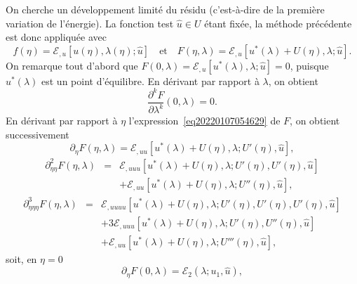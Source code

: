 \documentclass{article}
\newcommand{\nocomma}{}
\newcommand{\nosymbol}{}
\begin{document}
On cherche un d{\'e}veloppement limit{\'e} du r{\'e}sidu (c'est-{\`a}-dire de
la premi{\`e}re variation de l'{\'e}nergie). La fonction test $\hat{u} \in U$
{\'e}tant fix{\'e}e, la m{\'e}thode pr{\'e}c{\'e}dente est donc appliqu{\'e}e
avec
\begin{equation}
  \label{eq20220107054629} f (\eta) =\mathcal{E}_{, u} [u (\eta), \lambda
  (\eta) ; \hat{u}] \quad \text{et} \quad F (\eta, \lambda) =\mathcal{E}_{, u}
  [u^{\ast} (\lambda) + U (\eta), \lambda ; \hat{u}] .
\end{equation}
On remarque tout d'abord que $F (0, \lambda) =\mathcal{E}_{, u} [u^{\ast}
(\lambda), \lambda ; \hat{u}] = 0$, puisque $u^{\ast} (\lambda)$ est un point
d'{\'e}quilibre. En d{\'e}rivant par rapport {\`a} $\lambda$, on obtient
\begin{equation}
  \label{eq20211112164240} \frac{\partial^k F}{\partial \lambda^k} (0,
  \lambda) = 0.
\end{equation}
En d{\'e}rivant par rapport {\`a} $\eta$ l'expression~\eqref{eq20220107054629}
de $F$, on obtient successivement
\begin{equation}
  \partial_{\eta} F (\eta, \lambda) =\mathcal{E}_{, u \nocomma u} [u^{\ast}
  (\lambda) + U (\eta), \lambda ; U' (\eta), \hat{u}],
\end{equation}
\begin{eqnarray}
  \partial_{\eta \nocomma \eta}^2 F (\eta, \lambda) & = & \mathcal{E}_{, u
  \nocomma u \nocomma u} [u^{\ast} (\lambda) + U (\eta), \lambda ; U' (\eta),
  U' (\eta), \hat{u}] \nonumber\\
  &  & \nosymbol +\mathcal{E}_{, u \nocomma u} [u^{\ast} (\lambda) + U
  (\eta), \lambda ; U'' (\eta), \hat{u}],
\end{eqnarray}
\begin{eqnarray}
  \partial_{\eta \nocomma \eta \nocomma \eta}^3 F (\eta, \lambda) & = &
  \mathcal{E}_{, u \nocomma u \nocomma u \nocomma u} [u^{\ast} (\lambda) + U
  (\eta), \lambda ; U' (\eta), U' (\eta), U' (\eta), \hat{u}] \nonumber\\
  &  & \nosymbol + 3\mathcal{E}_{, u \nocomma u \nocomma u} [u^{\ast}
  (\lambda) + U (\eta), \lambda ; U' (\eta), U'' (\eta), \hat{u}] \nonumber\\
  &  & \nosymbol +\mathcal{E}_{, u \nocomma u} [u^{\ast} (\lambda) + U
  (\eta), \lambda ; U''' (\eta), \hat{u}],
\end{eqnarray}
soit, en $\eta = 0$
\begin{equation}
  \partial_{\eta} F (0, \lambda) =\mathcal{E}_2 (\lambda ; u_1, \hat{u}),
\end{equation}
\end{document}
